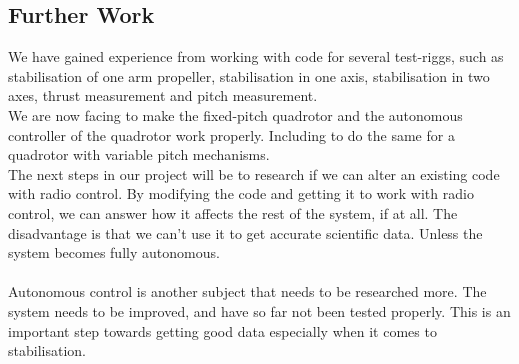 \subsection{Further Work}
We have gained experience from working with code for several test-riggs, such as stabilisation of one arm propeller, stabilisation in one axis, stabilisation in two axes, thrust measurement and pitch measurement. \\
We are now facing to make the fixed-pitch quadrotor and the autonomous controller of the quadrotor work properly. Including to do the same for a quadrotor with variable pitch mechanisms. \\
The next steps in our project will be to research if we can alter an existing code with radio control. By modifying the code and getting it to work with radio control, we can answer how it affects the rest of the system, if at all. The disadvantage is that we can't use it to get accurate scientific data. Unless the system becomes fully autonomous.\\
\\
Autonomous control is another subject that needs to be researched more. The system needs to be improved, and have so far not been tested properly. This is an important step towards getting good data especially when it comes to stabilisation. 

\newpage